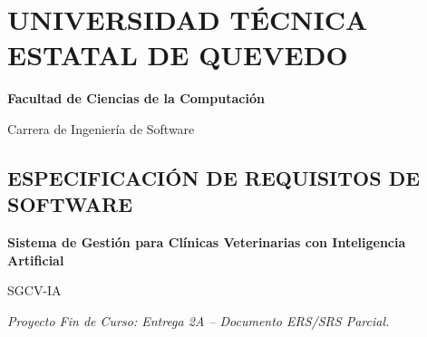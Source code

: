 \documentclass[
]{article}
\author{}
\date{}
\begin{document}
\section{UNIVERSIDAD TÉCNICA ESTATAL DE
QUEVEDO}\label{universidad-tuxe9cnica-estatal-de-quevedo}

\textbf{Facultad de Ciencias de la Computación}

Carrera de Ingeniería de Software

\subsection{ESPECIFICACIÓN DE REQUISITOS DE
SOFTWARE}\label{especificaciuxf3n-de-requisitos-de-software}

\textbf{Sistema de Gestión para Clínicas Veterinarias con Inteligencia
Artificial}

SGCV-IA

\emph{Proyecto Fin de Curso: Entrega 2A -- Documento ERS/SRS Parcial.}
\end{document}

